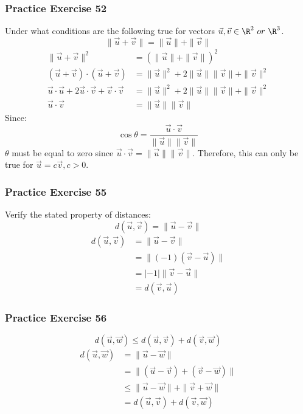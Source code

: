 \documentclass[letterpaper, 12pt]{math}
\begin{document}
\subsubsection*{Practice Exercise 52}
Under what conditions are the following true for vectors \( \vec{u},\vec{v}
\in\R^2\ or\ \R^3 \).
\[ \|\vec{u}+\vec{v}\| = \|\vec{u}\|+\|\vec{v}\| \]
\begin{align*}
  \|\vec{u}+\vec{v}\|^2 &= (\|\vec{u}\|+\|\vec{v}\|)^2 \\
  (\vec{u}+\vec{v})\cdot(\vec{u}+\vec{v}) &= \|\vec{u}\|^2+
    2\|\vec{u}\|\|\vec{v}\|+\|\vec{v}\|^2 \\
  \vec{u}\cdot\vec{u}+2\vec{u}\cdot\vec{v}+\vec{v}\cdot\vec{v} &=
    \|\vec{u}\|^2+2\|\vec{u}\|\|\vec{v}\|+\|\vec{v}\|^2 \\
  \vec{u}\cdot\vec{v} &= \|\vec{u}\|\|\vec{v}\|
\end{align*}
Since:
\[ \cos\theta = \frac{\vec{u}\cdot\vec{v}}{\|\vec{u}\|\|\vec{v}\|} \]
\( \theta \) must be equal to zero since \( \vec{u}\cdot\vec{v} =
\|\vec{u}\|\|\vec{v}\| \). Therefore, this can only be true for \( \vec{u} =
c\vec{v}, c > 0 \).

\subsubsection*{Practice Exercise 55}
Verify the stated property of distances:
\[ d(\vec{u},\vec{v}) = \|\vec{u}-\vec{v}\| \]
\begin{align*}
  d(\vec{u},\vec{v}) &= \|\vec{u}-\vec{v}\| \\
  &= \|(-1)(\vec{v}-\vec{u})\| \\
  &= |-1|\|\vec{v}-\vec{u}\| \\
  &= d(\vec{v},\vec{u})
\end{align*}

\subsubsection*{Practice Exercise 56}
\[ d(\vec{u},\vec{w}) \le d(\vec{u},\vec{v})+d(\vec{v},\vec{w}) \]
\begin{align*}
  d(\vec{u},\vec{w}) &= \|\vec{u}-\vec{w}\| \\
  &= \|(\vec{u}-\vec{v})+(\vec{v}-\vec{w})\| \\
  &\le \|\vec{u}-\vec{w}\|+\|\vec{v}+\vec{w}\| \\
  &= d(\vec{u},\vec{v})+d(\vec{v},\vec{w})
\end{align*}
\end{document}

